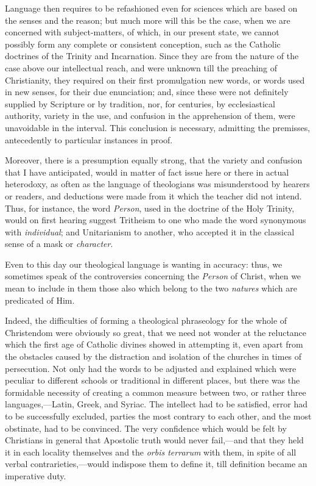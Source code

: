 Language then requires to be refashioned even for sciences which
are based on the senses and the reason; but much more will this be the
case, when we are concerned with subject-matters, of which, in our
present state, we cannot possibly form any complete or consistent
conception, such as the Catholic doctrines of the Trinity and
Incarnation. Since they are from the nature of the case above our
intellectual reach, and were unknown till the preaching of
Christianity, they required on their first promulgation new words, or
words used in new senses, for their due enunciation; and, since these
were not definitely supplied by Scripture or by tradition, nor, for
centuries, by ecclesiastical authority, variety in the use, and
confusion in the apprehension of them, were unavoidable in the
interval. This conclusion is necessary, admitting the premisses,
antecedently to particular instances in proof.

Moreover, there is a presumption equally strong, that the variety
and confusion that I have anticipated, would in matter of fact issue
here or there in actual heterodoxy, as often as the language of
theologians was misunderstood by hearers or readers, and deductions
were made from it which the teacher did not intend. Thus, for
instance, the word \emph{Person}, used in the doctrine of the Holy
Trinity, would on first hearing suggest Tritheism to one who made the
word synonymous with \emph{individual}; and Unitarianism to another,
who accepted it in the classical sense of a mask or \emph{character}.

Even to this day our theological language is wanting in accuracy:
thus, we sometimes speak of the controversies concerning the \emph{Person}
of Christ, when we mean to include in them those also which belong to
the two \emph{natures} which are predicated of Him.

Indeed, the difficulties of forming a theological phraseology for the whole of Christendom were obviously so great, that we need not
wonder at the reluctance which the first age of Catholic divines
showed in attempting it, even apart from the obstacles caused by the
distraction and isolation of the churches in times of persecution. Not
only had the words to be adjusted and explained which were peculiar to
different schools or traditional in different places, but there was
the formidable necessity of creating a common measure between two, or
rather three languages,—Latin, Greek, and Syriac. The intellect had
to be satisfied, error had to be successfully excluded, parties the
most contrary to each other, and the most obstinate, had to be
convinced. The very confidence which would be felt by Christians in
general that Apostolic truth would never fail,—and that they held it
in each locality themselves and the \emph{orbis terrarum} with them,
in spite of all verbal contrarieties,—would indispose them to define
it, till definition became an imperative duty.

